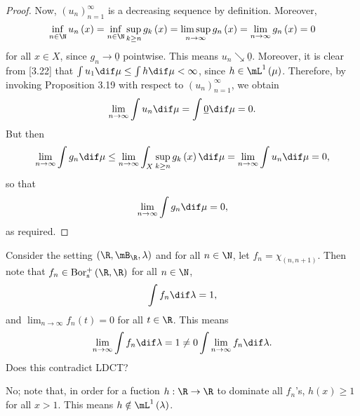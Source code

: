 \documentclass[pmath450]{subfiles}
\begin{document}
\begin{proof}
        Now, $\left( u_{n} \right)^{\infty}_{n=1}$ is a decreasing sequence by definition. Moreover,
        \begin{equation*}
            \inf_{n\in\N} u_n\left( x \right) = \inf_{n\in\N}\sup_{k\geq n}g_k\left( x \right)=\limsup_{n\to\infty}g_n\left( x \right)=\lim_{n\to\infty}g_n\left( x \right)=0
        \end{equation*}
        for all $x\in X$, since $g_n\to\underline{0}$ pointwise. This means $u_n\searrow\underline{0}$. Moreover, it is clear from [3.22] that $\int u_1\dif\mu\leq\int h\dif\mu < \infty$, since $h\in\lone\left( \mu \right)$. Therefore, by invoking Proposition 3.19 with respect to $\left( u_{n} \right)^{\infty}_{n=1}$, we obtain
        \begin{equation*}
            \lim_{n\to\infty} \int u_n\dif\mu = \int\underline{0}\dif\mu = 0.
        \end{equation*}
        But then
        \begin{equation*}
            \lim_{n\to\infty}\int g_n\dif\mu\leq\lim_{n\to\infty}\int^{}_{X}\sup_{k\geq n}g_k\left( x \right)\dif\mu = \lim_{n\to\infty}\int u_n\dif\mu = 0,
        \end{equation*}
        so that
        \begin{equation*}
            \lim_{n\to\infty}\int g_n\dif\mu = 0,
        \end{equation*}
        as required.
    \end{proof}

    \begin{example}{}
        Consider the setting $\left( \R,\mB_{\R},\lambda \right)$ and for all $n\in\N$, let $f_n=\chi_{\left( n,n+1 \right)}$. Then note that $f_n\in\borpluss\left( \R,\R \right)$ for all $n\in\N$,
        \begin{equation*}
            \int f_n\dif\lambda = 1,
        \end{equation*}
        and $\lim_{n\to\infty}f_n\left( t \right)=0$ for all $t\in\R$. This means
        \begin{equation*}
            \lim_{n\to\infty} \int f_n\dif\lambda = 1 \neq 0 \int\lim_{n\to\infty}f_n\dif\lambda.
        \end{equation*}
        Does this contradict LDCT?
    \end{example}

    \begin{answer}
        No; note that, in order for a fuction $h:\R\to\R$ to dominate all $f_n$'s, $h\left( x \right)\geq 1$ for all $x>1$. This means $h\notin\lone\left( \lambda \right)$.
    \end{answer}
\end{document}
